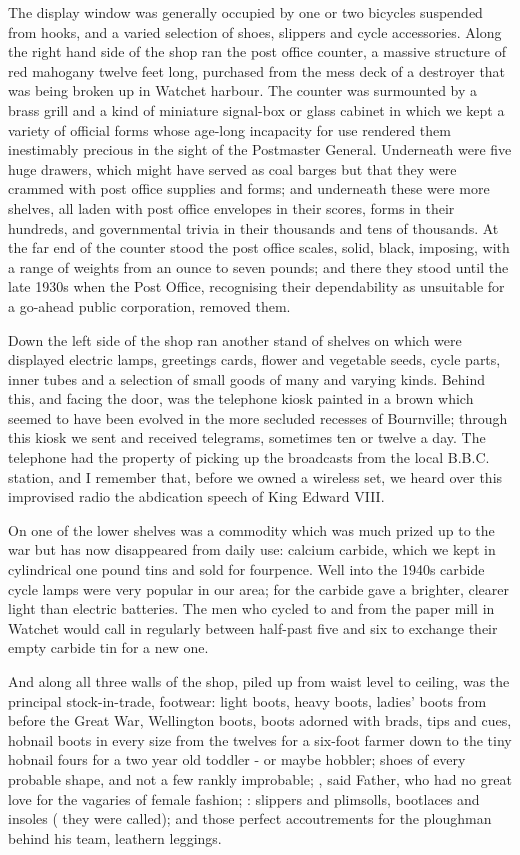 The display window was generally occupied by one or two bicycles suspended from hooks, and a varied selection of shoes, slippers and cycle accessories. Along the right hand side of the shop ran the post office counter, a massive structure of red mahogany twelve feet long, purchased from the mess deck of a destroyer that was being broken up in Watchet harbour. The counter was surmounted by a brass grill and a kind of miniature signal-box or glass cabinet in which we kept a variety of official forms whose age-long incapacity for use rendered them inestimably precious in the sight of the Postmaster General. Underneath were five huge drawers, which might have served as coal barges but that they were crammed with post office supplies and forms; and underneath these were more shelves, all laden with post office envelopes in their scores, forms in their hundreds, and governmental trivia in their thousands and tens of thousands. At the far end of the counter stood the post office scales, solid, black, imposing, with a range of weights from an ounce to seven pounds; and there they stood until the late 1930s when the Post Office, recognising their dependability as unsuitable for a go-ahead public corporation, removed them.

Down the left side of the shop ran another stand of shelves on which were displayed electric lamps, greetings cards, flower and vegetable seeds, cycle parts, inner tubes and a selection of small goods of many and varying kinds. Behind this, and facing the door, was the telephone kiosk painted in a brown which seemed to have been evolved in the more secluded recesses of Bournville; through this kiosk we sent and received telegrams, sometimes ten or twelve a day. The telephone had the property of picking up the broadcasts from the local B.B.C. station, and I remember that, before we owned a wireless set, we heard over this improvised radio the abdication speech of King Edward VIII.

On one of the lower shelves was a commodity which was much prized up to the war but has now disappeared from daily use: calcium carbide, which we kept in cylindrical one pound tins and sold for fourpence. Well into the 1940s carbide cycle lamps were very popular in our area; for the carbide gave a brighter, clearer light than electric batteries. The men who cycled to and from the paper mill in Watchet would call in regularly between half-past five and six to exchange their empty carbide tin for a new one.

And along all three walls of the shop, piled up from waist level to ceiling, was the principal stock-in-trade, footwear: light boots, heavy boots, ladies' boots from before the Great War, Wellington boots, boots adorned with brads, tips and cues, hobnail boots in every size from the twelves for a six-foot farmer down to the tiny hobnail fours for a two year old toddler - or maybe hobbler; shoes of every probable shape, and not a few rankly improbable; , said Father, who had no great love for the vagaries of female fashion; : slippers and plimsolls, bootlaces and insoles ( they were called); and those perfect accoutrements for the ploughman behind his team, leathern leggings.

